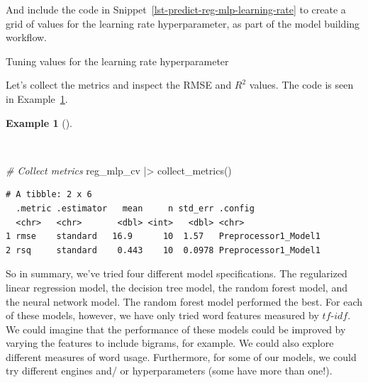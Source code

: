 \documentclass[
  letterpaper,
]{book}
\newenvironment{Shaded}{\begin{snugshade}}{\end{snugshade}}
\newcommand{\AttributeTok}[1]{\textcolor[rgb]{0.00,0.00,0.00}{#1}}
\newcommand{\CommentTok}[1]{\textcolor[rgb]{0.00,0.00,0.00}{\textit{#1}}}
\newcommand{\DecValTok}[1]{\textcolor[rgb]{0.00,0.00,0.00}{#1}}
\newcommand{\FunctionTok}[1]{\textcolor[rgb]{0.00,0.00,0.00}{#1}}
\newcommand{\NormalTok}[1]{\textcolor[rgb]{0.00,0.00,0.00}{#1}}
\newcommand{\OtherTok}[1]{\textcolor[rgb]{0.00,0.00,0.00}{#1}}
\newcommand{\SpecialCharTok}[1]{\textcolor[rgb]{0.00,0.00,0.00}{#1}}
\theoremstyle{definition}
\newtheorem{example}{Example}[chapter]
\theoremstyle{remark}
\begin{document}
And include the code in Snippet~\ref{lst-predict-reg-mlp-learning-rate}
to create a grid of values for the learning rate hyperparameter, as part
of the model building workflow.

\begin{codelisting}

\caption{\label{lst-predict-reg-mlp-learning-rate}Tuning values for the
learning rate hyperparameter}

\centering{

\begin{Shaded}
\begin{Highlighting}[]
\NormalTok{reg\_grid }\OtherTok{\textless{}{-}}
  \FunctionTok{grid\_regular}\NormalTok{(}\FunctionTok{learn\_rate}\NormalTok{(), }\AttributeTok{levels =} \DecValTok{10}\NormalTok{)}
\end{Highlighting}
\end{Shaded}

}

\end{codelisting}%

Let's collect the metrics and inspect the RMSE and \(R^2\) values. The
code is seen in Example~\ref{exm-predict-reg-metrics-mlp}.

\begin{example}[]\protect\hypertarget{exm-predict-reg-metrics-mlp}{}\label{exm-predict-reg-metrics-mlp}

~

\begin{Shaded}
\begin{Highlighting}[]
\CommentTok{\# Collect metrics}
\NormalTok{reg\_mlp\_cv }\SpecialCharTok{|\textgreater{}} \FunctionTok{collect\_metrics}\NormalTok{()}
\end{Highlighting}
\end{Shaded}

\begin{verbatim}
# A tibble: 2 x 6
  .metric .estimator   mean     n std_err .config             
  <chr>   <chr>       <dbl> <int>   <dbl> <chr>               
1 rmse    standard   16.9      10  1.57   Preprocessor1_Model1
2 rsq     standard    0.443    10  0.0978 Preprocessor1_Model1
\end{verbatim}

\end{example}

So in summary, we've tried four different model specifications. The
regularized linear regression model, the decision tree model, the random
forest model, and the neural network model. The random forest model
performed the best. For each of these models, however, we have only
tried word features measured by \(tf\)-\(idf\). We could imagine that
the performance of these models could be improved by varying the
features to include bigrams, for example. We could also explore
different measures of word usage. Furthermore, for some of our models,
we could try different engines and/ or hyperparameters (some have more
than one!).
\end{document}
